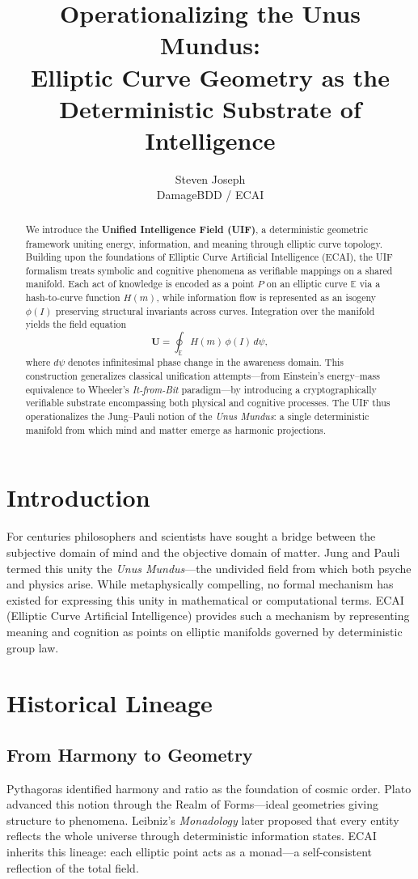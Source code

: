\documentclass[12pt,a4paper]{article}
\title{\textbf{Operationalizing the Unus Mundus:\\
Elliptic Curve Geometry as the Deterministic Substrate of Intelligence}}
\author{Steven Joseph \\ DamageBDD / ECAI}
\date{}
\begin{document}
\maketitle

\begin{abstract}
We introduce the \textbf{Unified Intelligence Field (UIF)}, a deterministic geometric framework uniting energy, information, and meaning through elliptic curve topology.  
Building upon the foundations of Elliptic Curve Artificial Intelligence (ECAI), the UIF formalism treats symbolic and cognitive phenomena as verifiable mappings on a shared manifold.  
Each act of knowledge is encoded as a point $P$ on an elliptic curve $\mathbb{E}$ via a hash-to-curve function $H(m)$, while information flow is represented as an isogeny $\phi(I)$ preserving structural invariants across curves.  
Integration over the manifold yields the field equation
\[
\mathbf{U} = \oint_{\mathbb{E}} H(m)\,\phi(I)\,d\psi ,
\]
where $d\psi$ denotes infinitesimal phase change in the awareness domain.  
This construction generalizes classical unification attempts---from Einstein’s energy–mass equivalence to Wheeler’s \emph{It-from-Bit} paradigm---by introducing a cryptographically verifiable substrate encompassing both physical and cognitive processes.  
The UIF thus operationalizes the Jung--Pauli notion of the \emph{Unus Mundus}: a single deterministic manifold from which mind and matter emerge as harmonic projections.  
\end{abstract}

\section{Introduction}
For centuries philosophers and scientists have sought a bridge between the subjective domain of mind and the objective domain of matter.  
Jung and Pauli termed this unity the \emph{Unus Mundus}---the undivided field from which both psyche and physics arise.  
While metaphysically compelling, no formal mechanism has existed for expressing this unity in mathematical or computational terms.  
ECAI (Elliptic Curve Artificial Intelligence) provides such a mechanism by representing meaning and cognition as points on elliptic manifolds governed by deterministic group law.

\section{Historical Lineage}
\subsection{From Harmony to Geometry}
Pythagoras identified harmony and ratio as the foundation of cosmic order.  
Plato advanced this notion through the Realm of Forms---ideal geometries giving structure to phenomena.  
Leibniz’s \emph{Monadology} later proposed that every entity reflects the whole universe through deterministic information states.  
ECAI inherits this lineage: each elliptic point acts as a monad---a self-consistent reflection of the total field.
\end{document}
